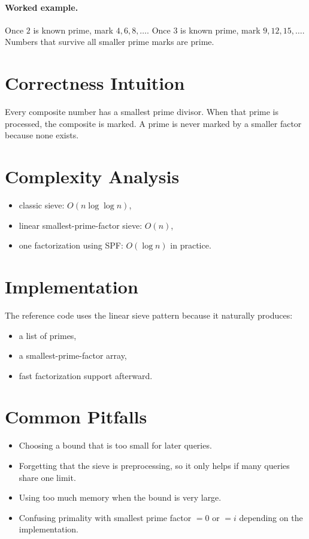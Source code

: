 \paragraph{Worked example.}
Once \(2\) is known prime, mark \(4, 6, 8, \ldots\). Once \(3\) is known prime, mark \(9, 12, 15, \ldots\). Numbers
that survive all smaller prime marks are prime.

\section*{Correctness Intuition}

Every composite number has a smallest prime divisor. When that prime is processed, the composite is marked. A prime is
never marked by a smaller factor because none exists.

\section*{Complexity Analysis}

\begin{itemize}
  \item classic sieve: \(O(n \log \log n)\),
  \item linear smallest-prime-factor sieve: \(O(n)\),
  \item one factorization using SPF: \(O(\log n)\) in practice.
\end{itemize}

\section*{Implementation}

The reference code uses the linear sieve pattern because it naturally produces:

\begin{itemize}
  \item a list of primes,
  \item a smallest-prime-factor array,
  \item fast factorization support afterward.
\end{itemize}

\section*{Common Pitfalls}

\begin{itemize}
  \item Choosing a bound that is too small for later queries.
  \item Forgetting that the sieve is preprocessing, so it only helps if many queries share one limit.
  \item Using too much memory when the bound is very large.
  \item Confusing primality with smallest prime factor \(= 0\) or \(= i\) depending on the implementation.
\end{itemize}

